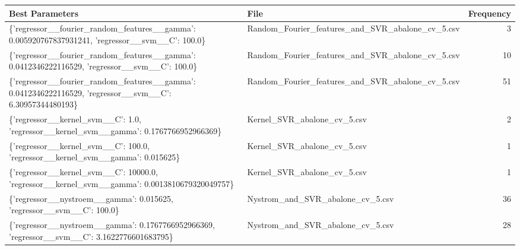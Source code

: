 \begin{tabularx}{\textwidth}{llr}
\toprule
                                                                                         Best Parameters &                                             File &  Frequency \\
\midrule
         \{'regressor\_\_fourier\_random\_features\_\_gamma': 0.005920767837931241, 'regressor\_\_svm\_\_C': 100.0\} & Random\_Fourier\_features\_and\_SVR\_abalone\_cv\_5.csv &          3 \\
           \{'regressor\_\_fourier\_random\_features\_\_gamma': 0.0412346222116529, 'regressor\_\_svm\_\_C': 100.0\} & Random\_Fourier\_features\_and\_SVR\_abalone\_cv\_5.csv &         10 \\
\{'regressor\_\_fourier\_random\_features\_\_gamma': 0.0412346222116529, 'regressor\_\_svm\_\_C': 6.30957344480193\} & Random\_Fourier\_features\_and\_SVR\_abalone\_cv\_5.csv &         51 \\
                   \{'regressor\_\_kernel\_svm\_\_C': 1.0, 'regressor\_\_kernel\_svm\_\_gamma': 0.1767766952966369\} &                      Kernel\_SVR\_abalone\_cv\_5.csv &          2 \\
                           \{'regressor\_\_kernel\_svm\_\_C': 100.0, 'regressor\_\_kernel\_svm\_\_gamma': 0.015625\} &                      Kernel\_SVR\_abalone\_cv\_5.csv &          1 \\
            \{'regressor\_\_kernel\_svm\_\_C': 10000.0, 'regressor\_\_kernel\_svm\_\_gamma': 0.0013810679320049757\} &                      Kernel\_SVR\_abalone\_cv\_5.csv &          1 \\
                                    \{'regressor\_\_nystroem\_\_gamma': 0.015625, 'regressor\_\_svm\_\_C': 100.0\} &                 Nystrom\_and\_SVR\_abalone\_cv\_5.csv &         36 \\
             \{'regressor\_\_nystroem\_\_gamma': 0.1767766952966369, 'regressor\_\_svm\_\_C': 3.1622776601683795\} &                 Nystrom\_and\_SVR\_abalone\_cv\_5.csv &         28 \\
\bottomrule
\end{tabularx}
